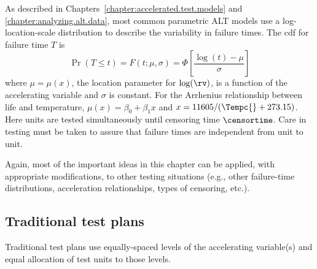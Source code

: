 As described in Chapters~\ref{chapter:accelerated.test.models} and
\ref{chapter:analyzing.alt.data}, most common parametric ALT models
use a log-location-scale distribution to describe the variability in
failure times. The cdf for failure time $T$ is
\begin{equation}
\label{equation:alt.prob.model}
\Pr(T \leq t)=F(t;\mu,\sigma)=\Phi\left[\frac{\log(t)-\mu}{\sigma}\right]
\end{equation}
where $\mu=\mu (x)$, the location parameter for $\log(\rv)$, is a
function of the accelerating variable and $\sigma$ is constant. For
the Arrhenius relationship between life and temperature, $\mu
(x)=\beta_{0}+\beta_{1}x$ and $x=11605/(\Tempc{}+273.15)$. Here
units are tested simultaneously until censoring time
$\censortime$. Care in testing must be taken to assure that failure
times are independent from unit to unit.

Again, most of the important ideas in this chapter can be applied,
with appropriate modifications, to other testing situations (e.g.,
other failure-time distributions, acceleration relationships, types
of censoring, etc.).

\subsection{Traditional test plans}
Traditional test plans use equally-spaced levels of the accelerating
variable(s) and equal allocation of test units to those levels.

